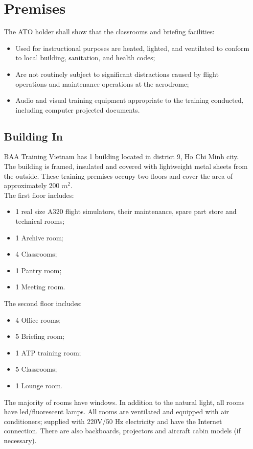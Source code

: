 \section{Premises}
    The ATO holder shall show that the classrooms and briefing facilities:
    \begin{itemize}
        \item Used for instructional purposes are heated, lighted, and ventilated to conform to local building, sanitation, and health codes;
        \item Are not routinely subject to significant distractions caused by flight operations and maintenance operations at the aerodrome;
        \item Audio and visual training equipment appropriate to the training conducted, including computer projected documents. 
    \end{itemize}
    \subsection{Building In}
        BAA Training Vietnam has 1 building located in district 9, Ho Chi Minh city. The building is framed, insulated and covered with lightweight metal 
        sheets from the outside. These training premises occupy two floors and cover the area of approximately 200 $m^2$. \\
        \vspace{3mm}
        The first floor includes:
        \begin{itemize}
            \item 1 real size A320 flight simulators, their maintenance, spare part store and technical rooms;
            \item 1 Archive room;
            \item 4 Classrooms;
            \item 1 Pantry room;
            \item 1 Meeting room.
        \end{itemize}
        The second floor includes:
        \begin{itemize}
            \item 4 Office rooms;
            \item 5 Briefing room;
            \item 1 ATP training room; 
            \item 5 Classrooms;
            \item 1 Lounge room.
        \end{itemize}
        The majority of rooms have windows. In addition to the natural light, all rooms have led/fluorescent lamps. All rooms are ventilated and equipped 
        with air conditioners; supplied with 220V/50 Hz electricity and have the Internet connection. There are also backboards, projectors and aircraft 
        cabin models (if necessary).
